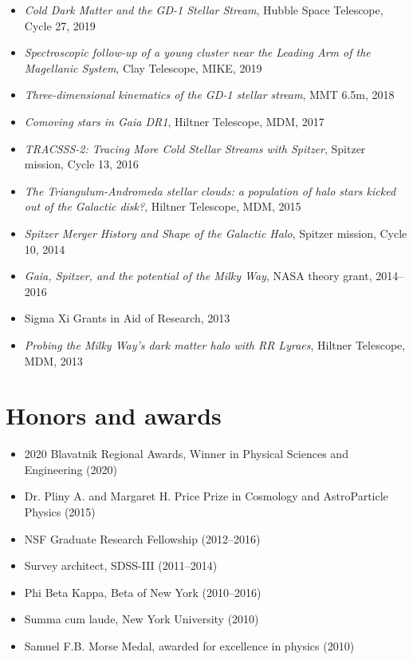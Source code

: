 \documentclass[12pt, letterpaper]{apw-cv}
\begin{document}
    \begin{itemize}
    \item {\it Cold Dark Matter and the GD-1 Stellar Stream}, Hubble Space Telescope, Cycle 27, 2019
    \item {\it Spectroscopic follow-up of a young cluster near the Leading Arm of the Magellanic System}, Clay Telescope, MIKE, 2019
    \item {\it Three-dimensional kinematics of the GD-1 stellar stream}, MMT 6.5m, 2018 %
    \item {\it Comoving stars in Gaia DR1}, Hiltner Telescope, MDM, 2017 %
    \item {\it TRACSSS-2: Tracing More Cold Stellar Streams with Spitzer}, Spitzer mission, Cycle 13, 2016 %
	\item {\it The Triangulum-Andromeda stellar clouds: a population of halo stars kicked out of the Galactic disk?}, Hiltner Telescope, MDM, 2015 %
	\item {\it Spitzer Merger History and Shape of the Galactic Halo}, Spitzer mission, Cycle 10, 2014 %
	\item {\it Gaia, Spitzer, and the potential of the Milky Way}, NASA theory grant, 2014--2016 %
	\item Sigma Xi Grants in Aid of Research, 2013 %
	\item {\it Probing the Milky Way's dark matter halo with RR Lyraes}, Hiltner Telescope, MDM, 2013 %
	\end{itemize}

\section*{Honors and awards}

    \begin{itemize}
    \item 2020 Blavatnik Regional Awards, Winner in Physical Sciences and Engineering (2020)
    \item Dr. Pliny A. and Margaret H. Price Prize in Cosmology and AstroParticle Physics (2015)
	\item NSF Graduate Research Fellowship (2012--2016)
	\item Survey architect, SDSS-III (2011--2014)
	\item Phi Beta Kappa, Beta of New York (2010--2016)
	\item Summa cum laude, New York University (2010)
	\item Samuel F.B. Morse Medal, awarded for excellence in physics (2010)
	\end{itemize}
\end{document}

